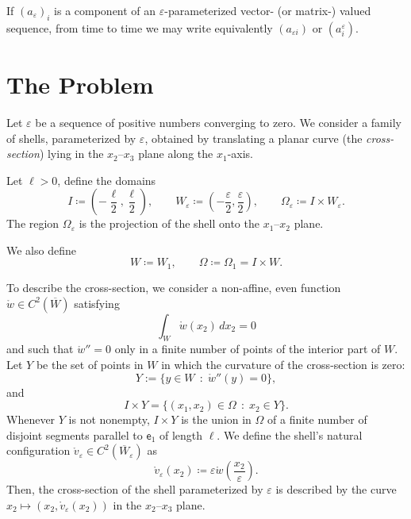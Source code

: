 \documentclass[a4, 11pt, reqno, final]{amsart}
\newcommand\e{\varepsilon}
\theoremstyle{plain}%
\DeclareMathOperator{\st}{\,:\,}
\begin{document}
	If $(a_\e)_i$ is a component of an $\e$-parameterized vector- (or matrix-) valued sequence, from time to time we may write equivalently $(a_{\e i})$ or $(a^\e_i)$.


	\section{The Problem}\label{sec:prob}

	Let $\e$ be a sequence of positive numbers converging to zero. We consider a family of shells, parameterized by $\e$, obtained by translating a planar curve (the \emph{cross-section}) lying in the $x_2$--$x_3$ plane along the $x_1$-axis.

	Let $\ell > 0$, define the domains
	$$
	I \coloneqq \left(-\frac{\ell}{2}, \frac{\ell}{2}\right), \qquad W_\e \coloneqq \left(-\frac{\e}{2}, \frac{\e}{2}\right), \qquad \Omega_\e \coloneqq I \times W_\e.
	$$
	The region $\Omega_\e$ is the projection of the shell onto the $x_1$--$x_2$ plane.

	\noindent
	We also define
	$$
	W \coloneqq W_1, \qquad \Omega \coloneqq \Omega_1 = I \times W.
	$$

	To describe the cross-section, we consider a non-affine, even function $\mathring{w} \in C^2(\overline{W})$ satisfying
	\begin{equation}\label{avwe0}
		\int_W \mathring{w}(x_2) \, dx_2 = 0
	\end{equation}
	and such that $\mathring{w}'' = 0$ only in a finite number of points of the interior part of $W$.
	Let $Y$ be the set of points in $W$ in which the curvature of the cross-section is zero:
	\begin{equation}\label{defY}
		Y := \{ y \in W \st \mathring{w}''(y) = 0\},
	\end{equation}
	and
	$$ I\times Y  = \{(x_1,x_2) \in \Omega \st x_2 \in Y \}.$$
	Whenever $Y$ is not nonempty, $I\times Y $ is the union in $\Omega$ of a finite number of disjoint segments parallel to $\mathsf{e}_1$ of length $\ell$.
	We define the shell's natural configuration $\mathring{v}_\e \in C^2(\overline{W}_\e)$ as
	$$
	\mathring{v}_\e(x_2) \coloneqq \e \mathring{w}(\frac{x_2}\e).
	$$
	Then, the cross-section of the shell parameterized by $\e$ is described by the curve $x_2 \mapsto (x_2, \mathring{v}_\e(x_2))$ in the $x_2$--$x_3$ plane.
\end{document}
